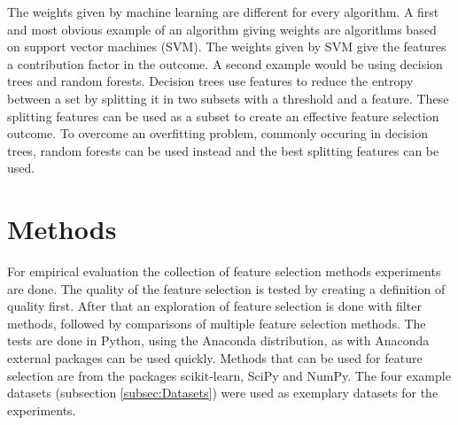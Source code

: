 \documentclass[10pt,a4paper]{article}
\begin{document}
	The weights given by machine learning are different for every algorithm. A first and most obvious example of an algorithm giving weights are algorithms based on support vector machines (SVM). The weights given by SVM give the features a contribution factor in the outcome\cite{jong2004feature, prados2004mining, zhang2006recursive, guyon2002gene}. A second example would be using decision trees and random forests. Decision trees use features to reduce the entropy between a set by splitting it in two subsets with a threshold and a feature. These splitting features can be used as a subset to create an effective feature selection outcome\cite{geurts2005proteomic, wu2003comparison, Duch2006}. To overcome an overfitting problem, commonly occuring in decision trees, random forests can be used instead and the best splitting features can be used\cite{liaw2002classification}.

	
	
	
	
	
	
	\section{Methods}
	\label{sec:Methods}

	For empirical evaluation the collection of feature selection methods experiments are done. The quality of the feature selection is tested by creating a definition of quality first. After that an exploration of feature selection is done with filter methods, followed by comparisons of multiple feature selection methods. The tests are done in Python, using the Anaconda distribution, as with Anaconda external packages can be used quickly. Methods that can be used for feature selection are from the packages scikit-learn\cite{pedregosa2011scikit}, SciPy\cite{jones2014scipy} and NumPy\cite{walt2011numpy}. The four example datasets (subsection \ref{subsec:Datasets}) were used as exemplary datasets for the experiments.
	
\end{document}
